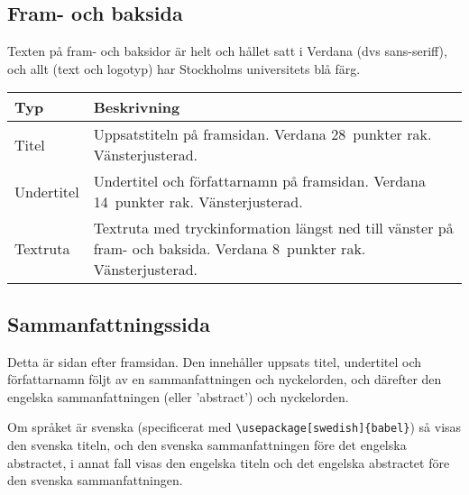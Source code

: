 \subsection{Fram- och baksida}

Texten på fram- och baksidor är helt och hållet satt i Verdana (dvs
sans-seriff), och allt (text och logotyp) har Stockholms universitets blå färg.

\medskip

\begin{tabular}{p{} p{}}
  \toprule
  {\sffamily\textbf{Typ}} &
  {\sffamily\textbf{Beskrivning}} \\
  \midrule
  {\sffamily\raggedright\LARGE\color{sublue}Titel} &
  Uppsatstiteln på framsidan. Verdana 28~punkter rak. Vänsterjusterad.
  \\
  \midrule
  {\color{sublue}\sffamily\large{}Undertitel} &
  Undertitel och författarnamn på framsidan. Verdana 14~punkter rak.
  Vänsterjusterad.
  \\
  \midrule
  {\color{sublue}\sffamily\small{}Textruta} &
  Textruta med tryckinformation längst ned till vänster på fram- och baksida.
  Verdana 8~punkter rak. Vänsterjusterad.
  \\
  \bottomrule
\end{tabular}


\subsection{Sammanfattningssida}

Detta är sidan efter framsidan. Den innehåller uppsats titel, undertitel och
författarnamn följt av en sammanfattningen och nyckelorden, och därefter den
engelska sammanfattningen (eller 'abstract') och nyckelorden.

Om språket är svenska (specificerat med \verb|\usepackage[swedish]{babel}|) så
visas den svenska titeln, och den svenska sammanfattningen före det engelska
abstractet, i annat fall visas den engelska titeln och det engelska abstractet
före den svenska sammanfattningen.

\medskip

